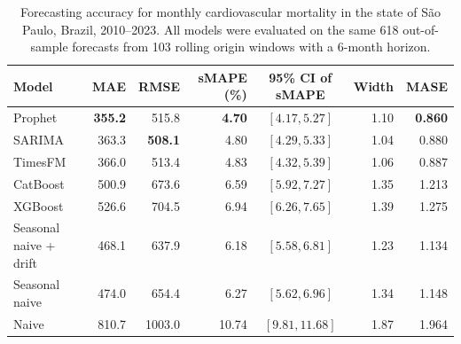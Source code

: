 \begin{table}[htbp]
\centering
\small
\setlength{\tabcolsep}{5pt}
\caption{Forecasting accuracy for monthly cardiovascular mortality in the state of
S\~ao Paulo, Brazil, 2010--2023. All models were evaluated on the same
618 out-of-sample forecasts from 103 rolling origin windows with a
6-month horizon.}
\label{tab:desempenho}
\begin{tabular}{lrrrcrr}
\toprule
Model & MAE & RMSE & sMAPE (\%) & 95\% CI of sMAPE & Width & MASE \\
\midrule
Prophet & \textbf{355.2} & 515.8 & \textbf{4.70} & $[4.17, 5.27]$ & 1.10 & \textbf{0.860} \\
SARIMA & 363.3 & \textbf{508.1} & 4.80 & $[4.29, 5.33]$ & 1.04 & 0.880 \\
TimesFM & 366.0 & 513.4 & 4.83 & $[4.32, 5.39]$ & 1.06 & 0.887 \\
CatBoost & 500.9 & 673.6 & 6.59 & $[5.92, 7.27]$ & 1.35 & 1.213 \\
XGBoost & 526.6 & 704.5 & 6.94 & $[6.26, 7.65]$ & 1.39 & 1.275 \\
\midrule
Seasonal naive + drift & 468.1 & 637.9 & 6.18 & $[5.58, 6.81]$ & 1.23 & 1.134 \\
Seasonal naive & 474.0 & 654.4 & 6.27 & $[5.62, 6.96]$ & 1.34 & 1.148 \\
Naive & 810.7 & 1003.0 & 10.74 & $[9.81, 11.68]$ & 1.87 & 1.964 \\
\bottomrule
\end{tabular}


\end{table}
